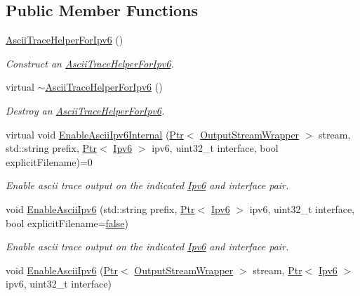 \subsection*{Public Member Functions}
\begin{DoxyCompactItemize}
\item 
\hyperlink{classns3_1_1AsciiTraceHelperForIpv6_a684514819213db30dfe533b2c426db62}{Ascii\+Trace\+Helper\+For\+Ipv6} ()
\begin{DoxyCompactList}\small\item\em Construct an \hyperlink{classns3_1_1AsciiTraceHelperForIpv6}{Ascii\+Trace\+Helper\+For\+Ipv6}. \end{DoxyCompactList}\item 
virtual \hyperlink{classns3_1_1AsciiTraceHelperForIpv6_a699cfcd2f6d475357b0684f49e66a766}{$\sim$\+Ascii\+Trace\+Helper\+For\+Ipv6} ()
\begin{DoxyCompactList}\small\item\em Destroy an \hyperlink{classns3_1_1AsciiTraceHelperForIpv6}{Ascii\+Trace\+Helper\+For\+Ipv6}. \end{DoxyCompactList}\item 
virtual void \hyperlink{classns3_1_1AsciiTraceHelperForIpv6_a4e9b410a23a53a76ef5f625867889618}{Enable\+Ascii\+Ipv6\+Internal} (\hyperlink{classns3_1_1Ptr}{Ptr}$<$ \hyperlink{classns3_1_1OutputStreamWrapper}{Output\+Stream\+Wrapper} $>$ stream, std\+::string prefix, \hyperlink{classns3_1_1Ptr}{Ptr}$<$ \hyperlink{classns3_1_1Ipv6}{Ipv6} $>$ ipv6, uint32\+\_\+t interface, bool explicit\+Filename)=0
\begin{DoxyCompactList}\small\item\em Enable ascii trace output on the indicated \hyperlink{classns3_1_1Ipv6}{Ipv6} and interface pair. \end{DoxyCompactList}\item 
void \hyperlink{classns3_1_1AsciiTraceHelperForIpv6_a390c3d37bf09c58cf55fbcd78f91cd19}{Enable\+Ascii\+Ipv6} (std\+::string prefix, \hyperlink{classns3_1_1Ptr}{Ptr}$<$ \hyperlink{classns3_1_1Ipv6}{Ipv6} $>$ ipv6, uint32\+\_\+t interface, bool explicit\+Filename=\hyperlink{lte__cqi__generation_8m_ab1bef239d413c4da139c4bac92cd657a}{false})
\begin{DoxyCompactList}\small\item\em Enable ascii trace output on the indicated \hyperlink{classns3_1_1Ipv6}{Ipv6} and interface pair. \end{DoxyCompactList}\item 
void \hyperlink{classns3_1_1AsciiTraceHelperForIpv6_ad923c3c674e88ebc6066b9022bcc65d2}{Enable\+Ascii\+Ipv6} (\hyperlink{classns3_1_1Ptr}{Ptr}$<$ \hyperlink{classns3_1_1OutputStreamWrapper}{Output\+Stream\+Wrapper} $>$ stream, \hyperlink{classns3_1_1Ptr}{Ptr}$<$ \hyperlink{classns3_1_1Ipv6}{Ipv6} $>$ ipv6, uint32\+\_\+t interface)

\end{DoxyCompactItemize}
